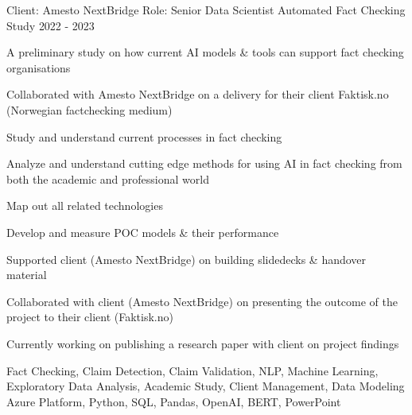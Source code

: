 


\begin{cventries}


\cventry
{Client: Amesto NextBridge \newline Role: Senior Data Scientist} %
{Automated Fact Checking Study} %
{}%
{2022 - 2023} %
{ %
\begin{cvitems}
\item {A preliminary study on how current AI models \& tools can support fact checking organisations}
\item {Collaborated with Amesto NextBridge on a delivery for their client Faktisk.no (Norwegian factchecking medium)}
\item {Study and understand current processes in fact checking}
\item {Analyze and understand cutting edge methods for using AI in fact checking from both the academic and professional world}
\item {Map out all related technologies}
\item {Develop and measure POC models \& their performance}
\item {Supported client (Amesto NextBridge) on building slidedecks \& handover material}
\item {Collaborated with client (Amesto NextBridge) on presenting the outcome of the project to their client (Faktisk.no)}
\item {Currently working on publishing a research paper with client on project findings}
\end{cvitems}
\cventrykeywords
{Fact Checking, Claim Detection, Claim Validation, NLP, Machine Learning, Exploratory Data Analysis, Academic Study, Client Management, Data Modeling}
{Azure Platform, Python, SQL, Pandas, OpenAI, BERT, PowerPoint}
}


\end{cventries}
